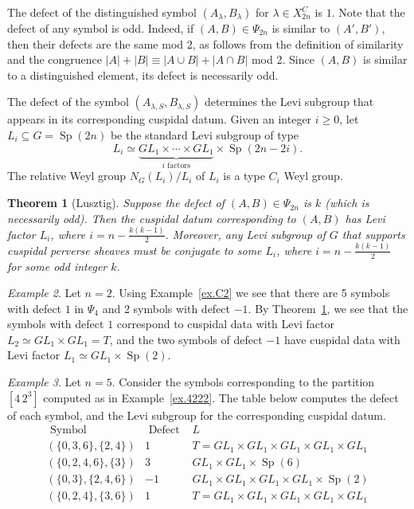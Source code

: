 \documentclass[reqno,11pt]{amsart}
\newtheorem{Thm}{Theorem}[section]
\theoremstyle{remark}
\theoremstyle{remark}
\newtheorem{example}[Thm]{Example}
\theoremstyle{definition}
\theoremstyle{definition}
\theoremstyle{definition}
\numberwithin{equation}{section}
\newcommand{\Sp}{\operatorname{Sp}}
\begin{document}
The defect of the distinguished symbol $(A_\lambda, B_\lambda)$ for $\lambda\in X_{2n}^C$ is $1$. Note that the defect of  any symbol is odd.  Indeed,  if $(A,B)\in \Psi_{2n}$ is similar to $(A',B')$, then their defects are the same mod 2, as follows from the definition of similarity and the congruence $|A| + |B| \equiv |A \cup B | + |A \cap B|$ mod 2.  Since $(A,B)$ is similar to a distinguished element, its defect is necessarily odd.

The defect of the symbol $(A_{\lambda, S}, B_{\lambda, S})$ determines the Levi subgroup that appears in its corresponding cuspidal datum. Given an integer $i \geq 0$, let  $L_i\subseteq G=\Sp(2n)$ be the standard Levi subgroup of type
\[
L_i \simeq \underbrace{GL_1\times \cdots  \times GL_1}_{\text{$i$ factors}} \times \Sp(2n-2i).
\]
The relative Weyl group $N_G(L_i)/L_i$ of $L_i$ is a type $C_i$ Weyl group. 

\begin{Thm}[Lusztig] \label{thm.Lusztig.TypeC}  Suppose the defect of $(A,B) \in \Psi_{2n}$ is $k$ (which is necessarily odd).  Then the cuspidal datum corresponding to $(A,B)$ has Levi factor $L_i$, where $i = n - \frac{k(k-1)}{2}$.  Moreover,  any Levi subgroup of $G$ that supports cuspidal perverse sheaves must be  conjugate to some $L_i$, where $i = n - \frac{k(k-1)}{2}$ for some odd integer $k$.  
\end{Thm}



\begin{example}\label{ex.defect1} Let $n=2$. Using Example~\ref{ex.C2} we see that there are 5 symbols with defect $1$ in $\Psi_4$ and 2 symbols with defect $-1$. 
By Theorem~\ref{thm.Lusztig.TypeC}, we see that the symbols with defect $1$ correspond to cuspidal data with Levi factor $L_2 \simeq GL_1\times GL_1 = T$, and the  two symbols of defect $-1$ have cuspidal data with Levi factor $L_1\simeq GL_1 \times \Sp(2)$.
\end{example}

\begin{example}\label{ex.defect2} Let $n=5$. Consider the symbols corresponding to the partition $[4\,2^3]$ computed as in Example~\ref{ex.4222}. The table below computes the defect of each symbol, and the Levi subgroup for the corresponding cuspidal datum. 
\[
\begin{array}{c|c|c}
\text{ Symbol } & \text{ Defect } & L\\ \hline
(\{0,3,6\},\{2,4\}) & 1 & T = GL_1\times GL_1 \times GL_1\times GL_1\times GL_1  \\
 (\{0,2,4,6\},\{3\}) & 3 & GL_1\times GL_1\times \Sp(6) \\
(\{0,3\},\{2,4,6\}) & -1 &  GL_1 \times GL_1\times GL_1\times GL_1\times \Sp(2) \\ 
(\{0,2,4\},\{3,6\}) & 1 &  T = GL_1\times GL_1 \times GL_1\times GL_1\times GL_1 
\end{array}
\]
\end{example}
\end{document}
